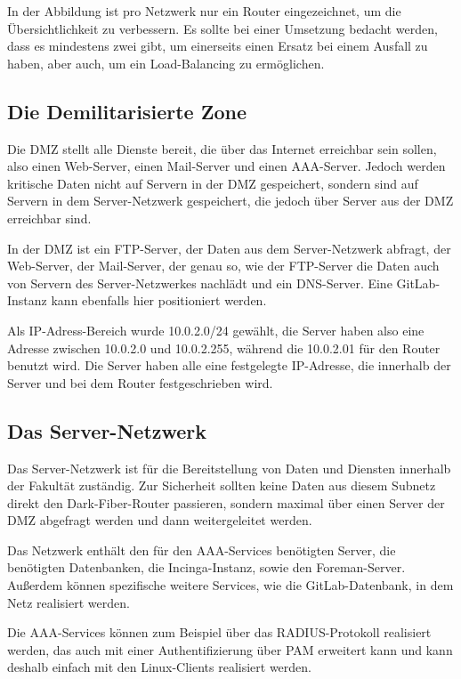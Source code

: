 In der Abbildung ist pro Netzwerk nur ein Router eingezeichnet, um die Übersichtlichkeit zu verbessern. Es sollte bei einer Umsetzung bedacht werden, dass es mindestens zwei gibt, um einerseits einen Ersatz bei einem Ausfall zu haben, aber auch, um  ein Load-Balancing zu ermöglichen.

\subsection{Die Demilitarisierte Zone}
Die DMZ stellt alle Dienste bereit, die über das Internet erreichbar sein sollen, also einen Web-Server, einen Mail-Server und einen AAA-Server. Jedoch werden kritische Daten nicht auf Servern in der DMZ gespeichert, sondern sind auf Servern in dem Server-Netzwerk gespeichert, die jedoch über Server aus der DMZ erreichbar sind.

In der DMZ ist ein FTP-Server, der Daten aus dem Server-Netzwerk abfragt, der Web-Server, der Mail-Server, der genau so, wie der FTP-Server die Daten auch von Servern des Server-Netzwerkes nachlädt und ein DNS-Server. Eine GitLab-Instanz kann ebenfalls hier positioniert werden.

Als IP-Adress-Bereich wurde 10.0.2.0/24 gewählt, die Server haben also eine Adresse zwischen 10.0.2.0 und 10.0.2.255, während die 10.0.2.01 für den Router benutzt wird. Die Server haben alle eine festgelegte IP-Adresse, die innerhalb der Server und bei dem Router festgeschrieben wird.


\subsection{Das Server-Netzwerk}
Das Server-Netzwerk ist für die Bereitstellung von Daten und Diensten innerhalb der Fakultät zuständig. Zur Sicherheit sollten keine Daten aus diesem Subnetz direkt den Dark-Fiber-Router passieren, sondern maximal über einen Server der DMZ abgefragt werden und dann weitergeleitet werden.

Das Netzwerk enthält den für den AAA-Services benötigten Server, die benötigten Datenbanken, die Incinga-Instanz, sowie den Foreman-Server. Außerdem können spezifische weitere Services, wie die GitLab-Datenbank, in dem Netz realisiert werden.

Die AAA-Services können zum Beispiel über das RADIUS-Protokoll realisiert werden, das auch mit einer Authentifizierung über PAM erweitert kann und kann deshalb einfach mit den Linux-Clients realisiert werden.

